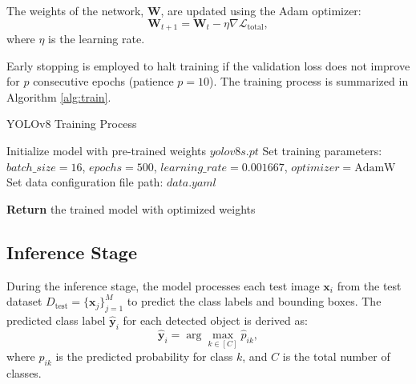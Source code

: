 The weights of the network, $\mathbf{W}$, are updated using the Adam optimizer:
\begin{equation}
    \mathbf{W}_{t+1} = \mathbf{W}_t - \eta \nabla \mathcal{L}_\text{total},
\end{equation}
where $\eta$ is the learning rate.

Early stopping is employed to halt training if the validation loss does not improve for $p$ consecutive epochs (patience $p = 10$). The training process is summarized in Algorithm \ref{alg:train}.

\begin{algorithm}[!h]
 \caption{YOLOv8 Training Process}
 \label{alg:train}
 
 Initialize model with pre-trained weights $yolov8s.pt$\;
 Set training parameters: $batch\_size = 16$, $epochs = 500$, $learning\_rate = 0.001667$, $optimizer = \text{AdamW}$\;
 Set data configuration file path: $data.yaml$\;
 
 \textbf{Return} the trained model with optimized weights\;
\end{algorithm}


\subsection{Inference Stage}
During the inference stage, the model processes each test image $\mathbf{x}_i$ from the test dataset $D_\text{test} = \{\mathbf{x}_j\}_{j=1}^M$ to predict the class labels and bounding boxes. The predicted class label $\hat{\mathbf{y}}_i$ for each detected object is derived as:
\begin{equation}
    \hat{\mathbf{y}}_i = \arg\max_{k \in [C]} \hat{p}_{ik},
\end{equation}
where $\hat{p}_{ik}$ is the predicted probability for class $k$, and $C$ is the total number of classes. 

